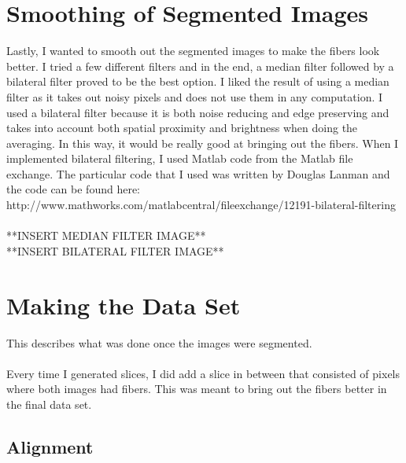 \documentclass[11pt,psfig]{article}
\begin{document}
\section{Smoothing of Segmented Images}

Lastly, I wanted to smooth out the segmented images to make the fibers look better. I tried a few different filters and in the end, a median filter followed by a bilateral filter proved to be the best option. I liked the result of using a median filter as it takes out noisy pixels and does not use them in any computation. I used a bilateral filter because it is both noise reducing and edge preserving and takes into account both spatial proximity and brightness when doing the averaging. In this way, it would be really good at bringing out the fibers. When I implemented bilateral filtering, I used Matlab code from the Matlab file exchange. The particular code that I used was written by Douglas Lanman and the code can be found here: http://www.mathworks.com/matlabcentral/fileexchange/12191-bilateral-filtering \\
\\
**INSERT MEDIAN FILTER IMAGE**
\\
**INSERT BILATERAL FILTER IMAGE**

\section{Making the Data Set}

This describes what was done once the images were segmented. \\
\\
Every time I generated slices, I did add a slice in between that consisted of pixels where both images had fibers. This was meant to bring out the fibers better in the final data set. 

\subsection{Alignment}
\end{document}
